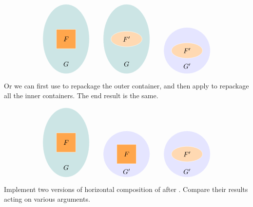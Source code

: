 \documentclass[DaoFP]{subfiles}
\begin{document}
\[
\begin{tikzpicture}
\filldraw[fill=blue!50!green!20, draw=white] (0, 0) ellipse (1.2 and 1.8);
\filldraw[fill=orange!70, draw=white] (-0.5, -0.5) rectangle (0.5, 0.5);
\node at (0, 0) {$F$};
\node at (0, -1.3) {$G$};
\end{tikzpicture}
\hspace{20pt}
\begin{tikzpicture}
\filldraw[fill=blue!50!green!20, draw=white] (0, 0) ellipse (1.2 and 1.8);
\filldraw[fill=orange!30, draw=white] (0, 0) ellipse (0.8 and 0.4);
\node at (0, 0) {$F'$};
\node at (0, -1.3) {$G$};
\end{tikzpicture}
\hspace{20pt}
\begin{tikzpicture}
\filldraw[fill=blue!10, draw=white] (0, 0) circle (1.2);
\filldraw[fill=orange!30, draw=white] (0, 0) ellipse (0.8 and 0.4);
\node at (0, 0) {$F'$};
\node at (0, -0.8) {$G'$};
\end{tikzpicture}
\]


Or we can first use  to repackage the outer container, and then apply  to repackage all the inner containers. The end result is the same.

\[
\begin{tikzpicture}
\filldraw[fill=blue!50!green!20, draw=white] (0, 0) ellipse (1.2 and 1.8);
\filldraw[fill=orange!70, draw=white] (-0.5, -0.5) rectangle (0.5, 0.5);
\node at (0, 0) {$F$};
\node at (0, -1.3) {$G$};
\end{tikzpicture}
\hspace{20pt}
\begin{tikzpicture}
\filldraw[fill=blue!10, draw=white] (0, 0) circle (1.2);
\filldraw[fill=orange!70, draw=white] (-0.5, -0.5) rectangle (0.5, 0.5);
\node at (0, 0) {$F$};
\node at (0, -0.9) {$G'$};
\end{tikzpicture}
\hspace{20pt}
\begin{tikzpicture}
\filldraw[fill=blue!10, draw=white] (0, 0) circle (1.2);
\filldraw[fill=orange!30, draw=white] (0, 0) ellipse (0.8 and 0.4);
\node at (0, 0) {$F'$};
\node at (0, -0.9) {$G'$};
\end{tikzpicture}
\]


\begin{exercise}
Implement two versions of horizontal composition of  after . Compare their results acting on various arguments.
\end{exercise}
\end{document}
